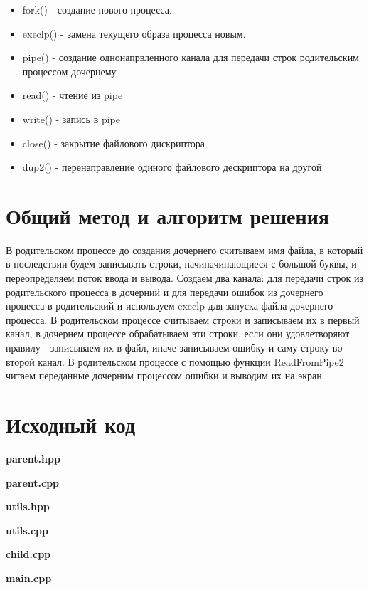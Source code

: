 \documentclass[a4paper, 14pt]{article}
\begin{document}
\begin{itemize}
    \item fork() - создание нового процесса.
    \item execlp() - замена текущего образа процесса новым.
    \item pipe() - создание однонапрвленного канала для передачи строк родительским процессом дочернему
    \item read() - чтение из pipe
    \item write() - запись в pipe
    \item close() - закрытие файлового дискриптора
    \item dup2() - перенаправление одиного файлового дескриптора на другой
\end{itemize}

\section*{Общий метод и алгоритм решения}

В родительском процессе до создания дочернего считываем имя файла, в который в последствии будем записывать строки, начиначинающиеся с большой буквы, и переопределяем поток ввода и вывода. Создаем два канала: для передачи строк из родительского процесса в дочерний и для передачи ошибок из дочернего процесса в родительский и используем execlp для запуска файла дочернего процесса. В родительском процессе считываем строки и записываем их в первый канал, в дочернем процессе обрабатываем эти строки, если они удовлетворяют правилу - записываем их в файл, иначе записываем ошибку и саму строку во второй канал. В родительском процессе с помощью функции ReadFromPipe2 читаем переданные дочерним процессом ошибки и выводим их на экран.
\newpage

\section*{Исходный код}

\textbf{parent.hpp}


\textbf{parent.cpp}


\textbf{utils.hpp}


\textbf{utils.cpp}


\textbf{child.cpp}


\textbf{main.cpp}

\end{document}
